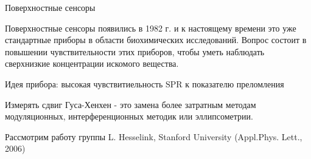 \documentclass[9pt, compress, xcolor=table]{beamer}
\begin{document}
\begin{frame}{Поверхностные сенсоры}

Поверхностные сенсоры появились в 1982 г. и к настоящему времени это уже стандартные приборы в области биохимических исследований. Вопрос состоит в повышении чувствительности этих приборов, чтобы уметь наблюдать сверхнизкие концентрации искомого вещества.

\vspace{0.5cm}

$\boxed{\text{Идея прибора: высокая чувствитиельность SPR к показателю преломления}}$

\vspace{0.5cm}

Измерять сдвиг Гуса-Хенхен - это замена более затратным методам модуляционных, интерференционных методик или эллипсометрии.

\vspace{0.5cm}

Рассмотрим работу группы L. Hesselink, Stanford University (Appl.Phys. Lett., 2006)


\end{frame}
\end{document}
